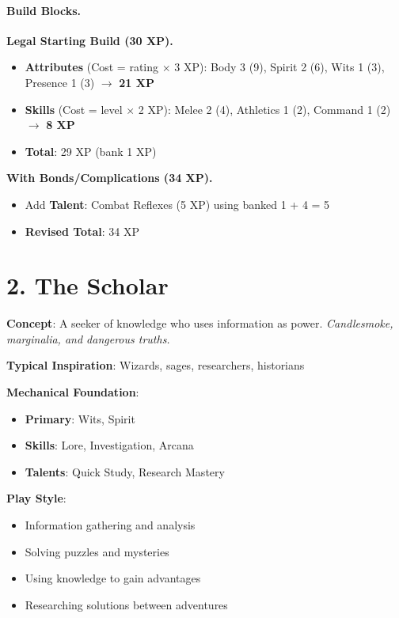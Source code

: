 \begin{multicols}{2}
\paragraph{Build Blocks.}
\textbf{Legal Starting Build (30 XP).}
\begin{itemize}
\item \textbf{Attributes} (Cost = rating $\times$ 3 XP): Body 3 (9), Spirit 2 (6), Wits 1 (3), Presence 1 (3) $\rightarrow$ \textbf{21 XP}
\item \textbf{Skills} (Cost = level $\times$ 2 XP): Melee 2 (4), Athletics 1 (2), Command 1 (2) $\rightarrow$ \textbf{8 XP}
\item \textbf{Total}: 29 XP (bank 1 XP)
\end{itemize}
\textbf{With Bonds/Complications (34 XP).}
\begin{itemize}
\item Add \textbf{Talent}: Combat Reflexes (5 XP) using banked 1 + 4 = 5
\item \textbf{Revised Total}: 34 XP
\end{itemize}

\section{2. The Scholar}

\textbf{Concept}: A seeker of knowledge who uses information as power. \emph{Candlesmoke, marginalia, and dangerous truths.}

\textbf{Typical Inspiration}: Wizards, sages, researchers, historians

\textbf{Mechanical Foundation}:
\begin{itemize}
\item \textbf{Primary}: Wits, Spirit
\item \textbf{Skills}: Lore, Investigation, Arcana
\item \textbf{Talents}: Quick Study, Research Mastery
\end{itemize}

\textbf{Play Style}:
\begin{itemize}
\item Information gathering and analysis
\item Solving puzzles and mysteries
\item Using knowledge to gain advantages
\item Researching solutions between adventures
\end{itemize}


\end{multicols}
